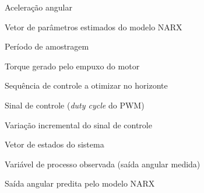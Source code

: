 \begin{simbolos}
    \item[$ \ddot{\theta} $] Aceleração angular
    \item[$ \hat{\theta} $] Vetor de parâmetros estimados do modelo NARX
    \item[$ T_s $] Período de amostragem
    \item[$ \tau $] Torque gerado pelo empuxo do motor
    \item[$ U_k $] Sequência de controle a otimizar no horizonte
    \item[$ u $] Sinal de controle (\textit{duty cycle} do PWM)
    \item[$ \Delta u $] Variação incremental do sinal de controle
    \item[$ x $] Vetor de estados do sistema
    \item[$ y $] Variável de processo observada (saída angular medida)
    \item[$ \hat{y} $] Saída angular predita pelo modelo NARX
\end{simbolos}


\tableofcontents*
\cleardoublepage
